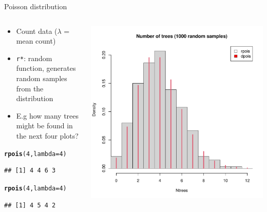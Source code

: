\documentclass[aspectratio=169]{beamer}\usepackage[]{graphicx}\usepackage[]{color}
\makeatletter
\def\maxwidth{ %
  \ifdim\Gin@nat@width>\linewidth
    \linewidth
  \else
    \Gin@nat@width
  \fi
}
\newcommand{\hlnum}[1]{\textcolor[rgb]{0.686,0.059,0.569}{#1}}%
\newcommand{\hlstd}[1]{\textcolor[rgb]{0.345,0.345,0.345}{#1}}%
\newcommand{\hlkwc}[1]{\textcolor[rgb]{0.333,0.667,0.333}{#1}}%
\newcommand{\hlkwd}[1]{\textcolor[rgb]{0.737,0.353,0.396}{\textbf{#1}}}%
\newenvironment{kframe}{%
 \def\at@end@of@kframe{}%
 \ifinner\ifhmode%
  \def\at@end@of@kframe{\end{minipage}}%
  \begin{minipage}{\columnwidth}%
 \fi\fi%
 \def\FrameCommand##1{\hskip\@totalleftmargin \hskip-\fboxsep
 \colorbox{shadecolor}{##1}\hskip-\fboxsep
     \hskip-\linewidth \hskip-\@totalleftmargin \hskip\columnwidth}%
 \MakeFramed {\advance\hsize-\width
   \@totalleftmargin\z@ \linewidth\hsize
   \@setminipage}}%
 {\par\unskip\endMakeFramed%
 \at@end@of@kframe}
\newenvironment{knitrout}{}{} %
\makeatother
\begin{document}
\begin{frame}[fragile]{Poisson distribution}
\begin{columns}
  \begin{column}{0.5\textwidth}
  \begin{itemize}
    \item Count data ($\lambda$ = mean count)
    \item \texttt{r*}: random function, generates random samples from the distribution
    \item E.g how many trees might be found in the next four plots?
  \end{itemize}
\begin{knitrout}\scriptsize
{}\color{fgcolor}\begin{kframe}
\begin{alltt}
\hlkwd{rpois}\hlstd{(}\hlnum{4}\hlstd{,}\hlkwc{lambda}\hlstd{=}\hlnum{4}\hlstd{)}
\end{alltt}
\begin{verbatim}
## [1] 4 4 6 3
\end{verbatim}
\begin{alltt}
\hlkwd{rpois}\hlstd{(}\hlnum{4}\hlstd{,}\hlkwc{lambda}\hlstd{=}\hlnum{4}\hlstd{)}
\end{alltt}
\begin{verbatim}
## [1] 4 5 4 2
\end{verbatim}
\end{kframe}
\end{knitrout}
  \end{column}
  \begin{column}{0.5\textwidth}
\begin{knitrout}\scriptsize
{}\color{fgcolor}
\includegraphics[width=\maxwidth]{figure/unnamed-chunk-10-1} 


\end{knitrout}
\end{column}
\end{columns}
\end{frame}
\end{document}
